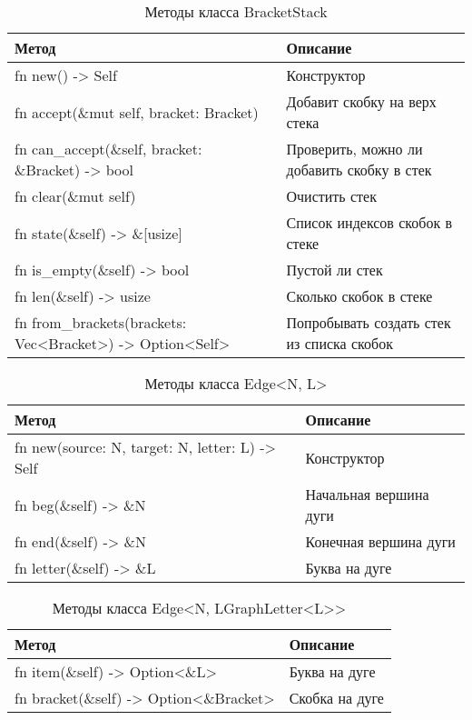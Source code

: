 \begin{table}
    \caption{Методы класса BracketStack}
    \label{class_BracketStack_api}
    \begin{tabular}{|m{20em}|m{20em}|}
        \hline
        \textbf{Метод} & \textbf{Описание}\\
        \hline
            fn new() -> Self & Конструктор \\
        \hline
            fn accept(\&mut self, bracket: Bracket) & Добавит скобку на верх стека \\
        \hline
            fn can\_accept(\&self, bracket: \&Bracket) -> bool & Проверить, можно ли добавить скобку в стек \\
        \hline
            fn clear(\&mut self) & Очистить стек \\
        \hline
            fn state(\&self) -> \&[usize] & Список индексов скобок в стеке \\
        \hline
            fn is\_empty(\&self) -> bool & Пустой ли стек \\
        \hline
            fn len(\&self) -> usize & Сколько скобок в стеке \\
        \hline
            fn from\_brackets(brackets: Vec<Bracket>) -> Option<Self> & Попробывать создать стек из списка скобок \\
        \hline
    \end{tabular}
\end{table}

\begin{table}
    \caption{Методы класса Edge<N, L>}
    \label{class_EdgeNL_api}
    \begin{tabular}{|m{20em}|m{20em}|}
        \hline
        \textbf{Метод} & \textbf{Описание}\\
        \hline
            fn new(source: N, target: N, letter: L) -> Self & Конструктор \\
        \hline
            fn beg(\&self) -> \&N & Начальная вершина дуги \\
        \hline
            fn end(\&self) -> \&N & Конечная вершина дуги \\
        \hline
            fn letter(\&self) -> \&L & Буква на дуге \\
        \hline
    \end{tabular}
\end{table}

\begin{table}
    \caption{Методы класса Edge<N, LGraphLetter<L>{}>}
    \label{class_EdgeNLGraphLetterL_api}
    \begin{tabular}{|m{20em}|m{20em}|}
        \hline
        \textbf{Метод} & \textbf{Описание}\\
        \hline
        fn item(\&self) -> Option<\&L> & Буква на дуге \\
        \hline
            fn bracket(\&self) -> Option<\&Bracket> & Скобка на дуге \\
        \hline
    \end{tabular}
\end{table}

